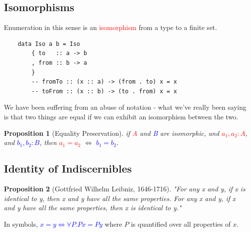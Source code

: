 \documentclass[tikz]{beamer}
\newcommand{\red}[1]{\textcolor{red}{#1}}
\newcommand{\mred}[1]{\textcolor{red}{$#1$}}
\newcommand{\blue}[1]{\textcolor{blue}{#1}}
\newcommand{\mblue}[1]{\textcolor{blue}{$#1$}}
\newcommand{\propnumber}{} %
\newtheorem*{prop}{Proposition \propnumber}
\theoremstyle{definition}
\begin{document}
\subsection{Isomorphisms}
\frame
{
	Enumeration in this sense is an \red{isomorphism} from a type to a finite set. 
}


\begin{frame}[fragile]

	\begin{verbatim}
	data Iso a b = Iso 
	    { to   :: a -> b
	    , from :: b -> a
	    }
	    -- fromTo :: (x :: a) -> (from . to) x = x
	    -- toFrom :: (x :: b) -> (to . from) x = x
	\end{verbatim}
\end{frame}

\frame
{
	We have been suffering from an abuse of notation - what we've really been saying is that two things are equal if we can exhibit an isomorphism between the two.
}

\frame
{ 
	\begin{prop}[Equality Preservation]
		if \red{A} and \blue{B} are isomorphic, and \mred{a_1, a_2 : A}, and \mblue{b_1, b_2 : B}, then \mred{a_1 = a_2} $\iff$ \mblue{b_1 = b_2}.
	\end{prop}
}

\subsection{Identity of Indiscernibles}
\frame
{

	\begin{prop}[Gottfried Wilhelm Leibniz, 1646-1716]
		"For any x and y, if x is identical to y, then x and y have all the same properties. For any x and y, if x and y have all the same properties, then x is identical to y."
	\end{prop}
	
}

\frame
{

	In symbols, \mblue{x = y \iff \forall P. Px = Py} where $P$ is quantified over all properties of $x$.
		
}
\end{document}
